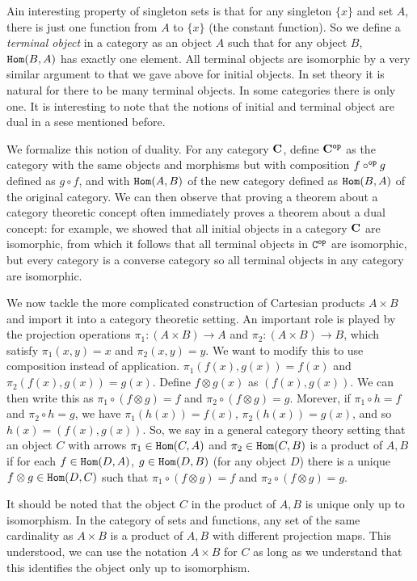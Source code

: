 \documentclass[12pt]{article}
\begin{document}
Ain interesting property of singleton sets is that for any singleton $\{x\}$ and set $A$, there is just one function from $A$ to $\{x\}$ (the constant function).  So we define a {\em terminal object\/} in a category as an object $A$ such that for any object $B$, ${\tt Hom}(B,A)$ has exactly one element.
All terminal objects are isomorphic by a very similar argument to that we gave above for initial objects.  In set theory it is natural for there to be many terminal objects.  In some categories there is only one.  It is interesting to note that the notions of initial and terminal object are dual in a sese mentioned before.

We formalize this notion of duality.  For any category ${\bf C}$, define ${\bf C^{\tt op}}$ as the category with the same objects and morphisms but with composition $f \circ^{\tt op} g$ defined as $g \circ f$, and with ${\tt Hom}(A,B)$ of the new category defined as ${\tt Hom}(B,A)$ of the original category.  We can then observe that proving a theorem about a category theoretic concept often immediately proves a theorem about a dual concept:  for example, we showed that all initial objects in a category ${\bf C}$ are isomorphic, from which it follows that all terminal objects in ${\tt C^{\tt op}}$ are isomorphic, but every category is a converse category so all terminal objects in any category are isomorphic.

We now tackle the more complicated construction of Cartesian products $A \times B$ and import it into a category theoretic setting.  An important role is played by the projection operations $\pi_1:(A \times B) \rightarrow A$ and $\pi_2:(A \times B) \rightarrow B$, which satisfy
$\pi_1(x,y) = x$ and $\pi_2(x,y) = y$.  We want to modify this to use composition instead of application.  $\pi_1(f(x),g(x)) = f(x)$ and $\pi_2(f(x),g(x)) = g(x)$.  Define $f \otimes g(x)$ as $(f(x),g(x))$.  We can then write this as $\pi_1\circ(f \otimes g) = f$ and
$\pi_2 \circ (f \otimes g) = g$.  Morever, if $\pi_1\circ h = f$ and $\pi_2\circ h = g$, we have $\pi_1(h(x)) = f(x)$, $\pi_2(h(x)) = g(x)$, and so $h(x) = (f(x),g(x))$.  So, we say in a general category theory setting that an object $C$ with arrows $\pi_1 \in {\tt Hom}(C,A)$ and
$\pi_2 \in {\tt Hom}(C,B)$ is a product of $A,B$ if for each $f \in {\tt Hom}(D,A)$, $g \in {\tt Hom}(D,B)$ (for any object $D$) there is a unique $f \otimes g \in {\tt Hom}(D,C)$ such that $\pi_1 \circ (f \otimes g) = f$ and $\pi_2 \circ (f \otimes g) = g$.

It should be noted that the object $C$ in the product of $A,B$ is unique only up to isomorphism.  In the category of sets and functions, any set of the same cardinality as $A \times B$ is a product of $A,B$ with different projection maps.  This understood, we can use the notation $A \times B$ for
$C$ as long as we understand that this identifies the object only up to isomorphism.
\end{document}
